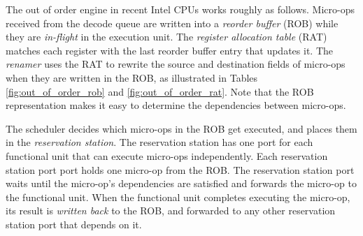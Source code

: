 
The out of order engine in recent Intel CPUs works roughly as follows.
Micro-ops received from the decode queue are written into a \textit{reorder
buffer} (ROB) while they are \textit{in-flight} in the execution unit. The
\textit{register allocation table} (RAT) matches each register with the last
reorder buffer entry that updates it. The \textit{renamer} uses the RAT to
rewrite the source and destination fields of micro-ops when they are written in
the ROB, as illustrated in Tables \ref{fig:out_of_order_rob} and
\ref{fig:out_of_order_rat}. Note that the ROB representation makes it easy to
determine the dependencies between micro-ops.

\begin{table}[hbt]
  \caption{
    Data written by the renamer into the reorder buffer (ROB), for the
    micro-ops in Table~\ref{fig:out_of_order_micro_ops}.
  }
  \label{fig:out_of_order_rob}
\end{table}

\begin{table}[hbt]
  \caption{
    Relevant entries of the register allocation table after the micro-ops in
    Table~\ref{fig:out_of_order_micro_ops} are inserted into the ROB.
  }
  \label{fig:out_of_order_rat}
\end{table}


The scheduler decides which micro-ops in the ROB get executed, and places them
in the \textit{reservation station}. The reservation station has one port
for each functional unit that can execute micro-ops independently. Each
reservation station port port holds one micro-op from the ROB. The reservation
station port waits until the micro-op's dependencies are satisfied and forwards
the micro-op to the functional unit. When the functional unit completes
executing the micro-op, its result is \textit{written back} to the ROB, and
forwarded to any other reservation station port that depends on it.

